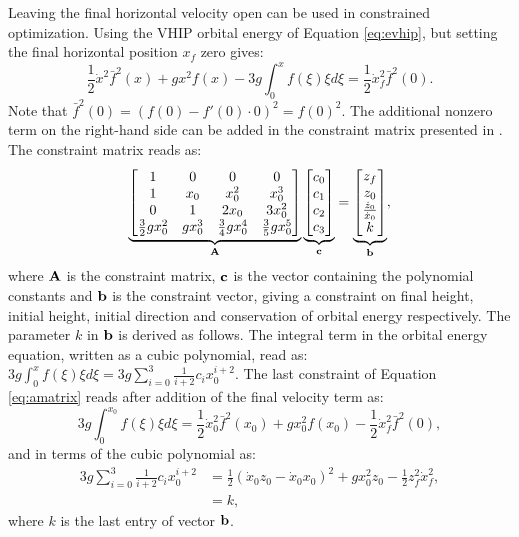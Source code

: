 Leaving the final horizontal velocity open can be used in constrained optimization. Using the \ac{VHIP} orbital energy of Equation \eqref{eq:evhip}, but setting the final horizontal position $x_f$ zero gives:
\begin{equation}
    \frac{1}{2}\dot{x}^2\bar{f}^2(x)+gx^2f(x) - 3g\int_{0}^xf(\xi)\xi d\xi = \frac{1}{2}\dot{x}_f^2\bar{f}^2(0).
\end{equation}
Note that $\bar{f}^2(0)=(f(0)-f'(0) \cdot 0)^2=f(0)^2$. The additional nonzero term on the right-hand side can be added in the constraint matrix presented in \cite{koolen2016balance}. The constraint matrix reads as:
\begin{equation}
    \underbrace{\begin{bmatrix}1 & 0 & 0 & 0 \\ 
     1 & x_0 & x_0^2 & x_0^3\\
     0 & 1 & 2x_0 & 3x_0^2\\
     \frac{3}{2}gx_0^2 & gx_0^3 & \frac{3}{4}gx_0^4 & \frac{3}{5}gx_0^5\\
     \end{bmatrix}}_{\mathbf{A}}
     \underbrace{\begin{bmatrix}
     c_0\\
     c_1\\
     c_2\\
     c_3\\
     \end{bmatrix}}_{\mathbf{c}}=
     \underbrace{\begin{bmatrix}
     z_f\\
     z_0\\
     \frac{\dot{z}_0}{\dot{x}_0}\\
     k\\
     \end{bmatrix}}_{\mathbf{b}},
     \label{eq:amatrix}
\end{equation}
where $\mathbf{A}$ is the constraint matrix, $\mathbf{c}$ is the vector containing the polynomial constants and $\mathbf{b}$ is the constraint vector, giving a constraint on final height, initial height, initial direction and conservation of orbital energy respectively.
The parameter $k$ in $\mathbf{b}$ is derived as follows. The integral term in the orbital energy equation, written as a cubic polynomial, read as: $3g\int_{0}^xf(\xi)\xi d\xi = 3g\sum_{i=0}^3\frac{1}{i+2}c_ix_0^{i+2}$. The last constraint of Equation \eqref{eq:amatrix} reads after addition of the final velocity term as:
\begin{equation}
		3g\int_{0}^{x_0}f(\xi)\xi d\xi =\frac{1}{2}\dot{x}_0^2\bar{f}^2(x_0)+gx_0^2f(x_0) - \frac{1}{2}\dot{x}_f^2\bar{f}^2(0),
\end{equation}
and in terms of the cubic polynomial as:
\begin{align}
	3g\sum_{i=0}^3\frac{1}{i+2}c_ix_0^{i+2}& = \frac{1}{2}(\dot{x}_0z_0-\dot{x}_0x_0)^2 + gx_0^2z_0 - \frac{1}{2}z_f^2\dot{x}_f^2,\\
	&=k,
\end{align}
where $k$ is the last entry of vector $\mathbf{b}$. 

